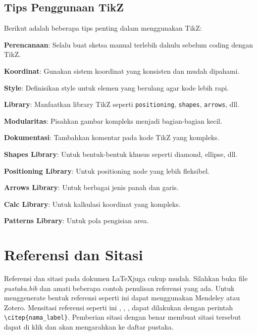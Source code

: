 \subsection{Tips Penggunaan TikZ}
Berikut adalah beberapa tips penting dalam menggunakan TikZ:

\begin{packed_enum}
    \item \textbf{Perencanaan}: Selalu buat sketsa manual terlebih dahulu sebelum coding dengan TikZ.
    \item \textbf{Koordinat}: Gunakan sistem koordinat yang konsisten dan mudah dipahami.
    \item \textbf{Style}: Definisikan style untuk elemen yang berulang agar kode lebih rapi.
    \item \textbf{Library}: Manfaatkan library TikZ seperti \texttt{positioning}, \texttt{shapes}, \texttt{arrows}, dll.
    \item \textbf{Modularitas}: Pisahkan gambar kompleks menjadi bagian-bagian kecil.
    \item \textbf{Dokumentasi}: Tambahkan komentar pada kode TikZ yang kompleks.
\end{packed_enum}

\begin{packed_item}
    \item \textbf{Shapes Library}: Untuk bentuk-bentuk khusus seperti diamond, ellipse, dll.
    \item \textbf{Positioning Library}: Untuk positioning node yang lebih fleksibel.
    \item \textbf{Arrows Library}: Untuk berbagai jenis panah dan garis.
    \item \textbf{Calc Library}: Untuk kalkulasi koordinat yang kompleks.
    \item \textbf{Patterns Library}: Untuk pola pengisian area.
\end{packed_item}

\section{Referensi dan Sitasi}
Referensi dan sitasi pada dokumen \LaTeX juga cukup mudah. Silahkan buka file \textit{pustaka.bib} dan amati beberapa contoh penulisan referensi yang ada. Untuk menggenerate bentuk referensi seperti ini dapat menggunakan Mendeley atau Zotero. Mensitasi referensi seperti ini \citep{Priambodo_2021}, \citep{Nasuha_2017}, \citep{Dhewa_Dharmawan_Priyambodo_2017}, \citep{Arifin_2015} dapat dilakukan dengan perintah \verb|\citep{nama_label}|. Pemberian sitasi dengan benar membuat sitasi tersebut dapat di klik dan akan mengarahkan ke daftar pustaka.
